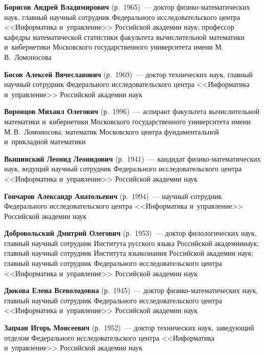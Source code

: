 \begin{multicols}{2}

\noindent
\textbf{Борисов Андрей Владимирович} (р.\ 1965)~--- доктор фи\-зи\-ко-ма\-те\-ма\-ти\-че\-ских наук, 
главный научный сотрудник Федерального исследовательского цент\-ра <<Информатика и~управ\-ле\-ние>>
 Российской академии наук; профессор ка\-фед\-ры математической ста\-ти\-сти\-ки факультета вы\-чис\-ли\-тель\-ной математики 
 и~кибернетики Московского государственного университета имени М.\,В.~Ломоносова

\noindent
\textbf{Босов Алексей Вячеславович} (р.\ 1969)~--- 
доктор технических наук, главный научный сотрудник Федерального исследовательского цент\-ра <<Информатика и~управ\-ле\-ние>> Российской академии наук


 
\noindent
\textbf{Воронцов Михаил Олегович} (р.\ 1996)~--- аспирант факультета вычислительной математики и~кибернетики Московского государственного университета 
имени М.\,В.~Ломоносова; математик Московского центра фундаментальной и~прикладной ма\-те\-ма\-тики


\noindent
\textbf{Вышинский Леонид Леонидович} (р.\ 1941)~--- кандидат фи\-зи\-ко-ма\-те\-ма\-ти\-че\-ских наук, 
ведущий научный сотрудник Федерального исследовательского цент\-ра <<Информатика и~управ\-ле\-ние>> Российской академии наук 

\noindent
\textbf{Гончаров Александр Анатольевич} (р.\ 1994)~--- 
научный сотрудник Федерального исследовательского цент\-ра <<Информатика и~управ\-ле\-ние>> Российской академии наук



\noindent
\textbf{Добровольский Дмитрий Олегович} (р.\ 1953)~--- 
доктор филологических наук, главный научный со\-труд\-ник Института русского языка Российской академии\linebreak наук; 
главный научный со\-труд\-ник Института языкознания Российской академии наук; 
главный \mbox{научный} со\-труд\-ник Федерального исследовательского цент\-ра <<Информатика и~управ\-ле\-ние>>
 Российской академии наук


\noindent
\textbf{Дюкова Елена Всеволодовна} (р.\ 1945)~--- доктор фи\-зи\-ко-ма\-те\-ма\-ти\-че\-ских наук, 
главный научный сотрудник Федерального исследовательского цент\-ра <<Информатика и~управ\-ле\-ние>> Российской академии наук

\noindent
\textbf{Зацман Игорь Моисеевич} (р.\ 1952)~--- 
доктор технических наук, заведующий отделом Федерального исследовательского цент\-ра <<Информатика и~управ\-ле\-ние>>
 Российской академии наук


\end{multicols}
